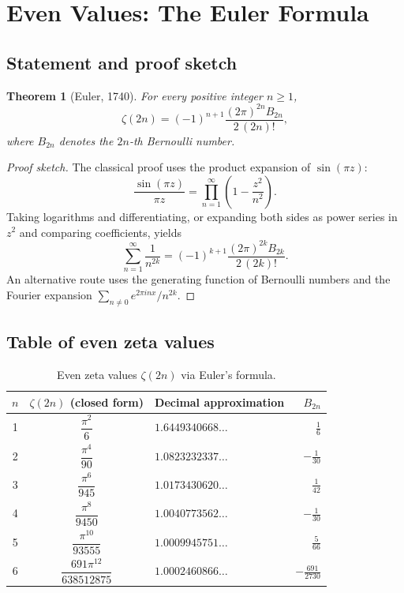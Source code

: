 \documentclass[12pt,a4paper]{amsart}
\newtheorem{theorem}{Theorem}[section]
\theoremstyle{definition}
\theoremstyle{remark}
\begin{document}
\section{Even Values: The Euler Formula}

\subsection{Statement and proof sketch}

\begin{theorem}[Euler, 1740]
  For every positive integer $n \geq 1$,
  \[
    \zeta(2n) = (-1)^{n+1} \frac{(2\pi)^{2n} B_{2n}}{2\,(2n)!},
  \]
  where $B_{2n}$ denotes the $2n$-th Bernoulli number.
\end{theorem}

\begin{proof}[Proof sketch]
  The classical proof uses the product expansion of $\sin(\pi z)$:
  \[
    \frac{\sin(\pi z)}{\pi z} = \prod_{n=1}^{\infty} \left(1 - \frac{z^2}{n^2}\right).
  \]
  Taking logarithms and differentiating, or expanding both sides as power series
  in $z^2$ and comparing coefficients, yields
  \[
    \sum_{n=1}^{\infty} \frac{1}{n^{2k}} = (-1)^{k+1} \frac{(2\pi)^{2k}
    B_{2k}}{2\,(2k)!}.
  \]
  An alternative route uses the generating function of Bernoulli numbers and the
  Fourier expansion $\sum_{n \neq 0} e^{2\pi i n x}/n^{2k}$.
\end{proof}

\subsection{Table of even zeta values}

\begin{table}[h]
  \centering
  \caption{Even zeta values $\zeta(2n)$ via Euler's formula.}
  \vspace{4pt}
  \begin{tabular}{@{}cclr@{}}
    \toprule
    $n$ & $\zeta(2n)$ (closed form) & Decimal approximation & $B_{2n}$ \\
    \midrule
    1 & $\dfrac{\pi^2}{6}$           & $1.6449340668\ldots$ & $\tfrac{1}{6}$     \\[6pt]
    2 & $\dfrac{\pi^4}{90}$          & $1.0823232337\ldots$ & $-\tfrac{1}{30}$   \\[6pt]
    3 & $\dfrac{\pi^6}{945}$         & $1.0173430620\ldots$ & $\tfrac{1}{42}$    \\[6pt]
    4 & $\dfrac{\pi^8}{9450}$        & $1.0040773562\ldots$ & $-\tfrac{1}{30}$   \\[6pt]
    5 & $\dfrac{\pi^{10}}{93555}$    & $1.0009945751\ldots$ & $\tfrac{5}{66}$    \\[6pt]
    6 & $\dfrac{691\pi^{12}}{638512875}$ & $1.0002460866\ldots$ & $-\tfrac{691}{2730}$ \\
    \bottomrule
  \end{tabular}
  \label{tab:even-zeta}
\end{table}
\end{document}
